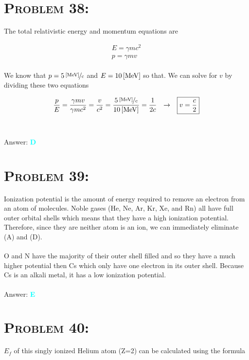 \documentclass{article}
\begin{document}

\section{\textsc{Problem 38:}} The total relativistic energy and momentum equations are


\begin{gather}
E = \gamma m c^{2}\\
p = \gamma m v
\end{gather}
\\
We know that $p = \unitfrac[5]{[MeV]}{c}$ and $E = \unit[10]{[MeV]}$ so that. We can solve for $v$ by dividing these two equations

\begin{gather}
\frac{p}{E} = \frac{\gamma m v}{\gamma m c^{2}} = \frac{v}{c^{2}} = \frac{\unitfrac[5]{[MeV]}{c}}{\unit[10]{[MeV]}} = \frac{1}{2c} \hspace{.1in} \rightarrow \hspace{.1in} \boxed{v = \frac{c}{2}} \nonumber
\end{gather}
\\\\
Answer: \textbf{\textcolor{cyan}D}\\


\section{\textsc{Problem 39:}} Ionization potential is the amount of energy required to remove an electron from an atom of molecules. Noble gases (He, Ne, Ar, Kr, Xe, and Rn) all have full outer orbital shells which means that they have a high ionization potential. Therefore, since they are neither atom is an ion, we can immediately eliminate (A) and (D). \\
\\
O and N have the majority of their outer shell filled and so they have a much higher potential then Cs which only have one electron in its outer shell. Because Cs is an alkali metal, it has a low ionization potential.
\\\\
Answer: \textbf{\textcolor{cyan}E}\\


\section{\textsc{Problem 40:}} $E_{f}$ of this singly ionized Helium atom (Z=2) can be calculated using the formula
\end{document}
